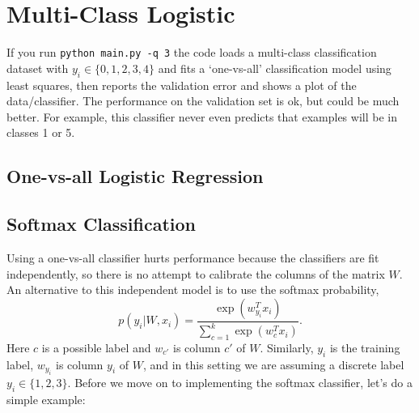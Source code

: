 \documentclass{article}
\begin{document}



\section{Multi-Class Logistic}

If you run \verb|python main.py -q 3| the code loads a multi-class classification dataset with $y_i \in \{0,1,2,3,4\}$ and fits a `one-vs-all' classification model using least squares, then reports the validation error and shows a plot of the data/classifier. The performance on the validation set is ok, but could be much better. For example, this classifier never even predicts that examples will be in classes 1 or 5.


\subsection{One-vs-all Logistic Regression}



\subsection{Softmax Classification}

Using a one-vs-all classifier hurts performance because the classifiers are fit independently, so there is no attempt to calibrate the columns of the matrix $W$. An alternative to this independent model is to use the softmax probability,
\[
p(y_i | W, x_i) = \frac{\exp(w_{y_i}^Tx_i)}{\sum_{c=1}^k\exp(w_c^Tx_i)}.
\]
Here $c$ is a possible label and $w_{c'}$ is column $c'$ of $W$. Similarly, $y_i$ is the training label, $w_{y_i}$ is column $y_i$ of $W$, and in this setting we are assuming a discrete label $y_i \in \{1,2,3\}$. Before we move on to implementing the softmax classifier, let's do a simple example:
\end{document}
